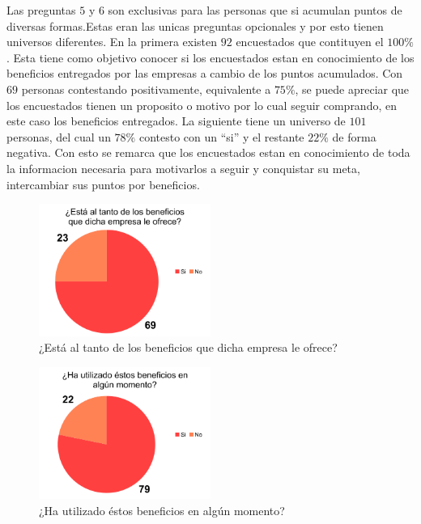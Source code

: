 Las preguntas $5$ y $6$ son exclusivas para las personas que si acumulan puntos de diversas formas.Estas
eran las unicas preguntas opcionales y por esto tienen universos diferentes.
En la primera existen $92$ encuestados que contituyen el $100\%$. Esta tiene como objetivo conocer
si los encuestados estan en conocimiento de los beneficios entregados por las empresas a cambio de
 los puntos acumulados. Con $69$ personas contestando positivamente, equivalente a $75\%$, se puede
apreciar que los encuestados tienen un proposito o motivo por lo cual seguir comprando, en este caso
los beneficios entregados.
La siguiente tiene un universo de $101$ personas, del cual un $78\%$ contesto con un ``si'' y el
restante $22\%$ de forma negativa. Con esto se remarca que los encuestados estan en conocimiento
de toda la informacion necesaria para motivarlos a seguir y conquistar su meta, intercambiar sus
puntos por beneficios.

\begin{figure}[!htb]
  \centering
  \includegraphics[width=0.5\textwidth]{images/chartPreg5.png}
  \caption[chart5]{¿Está al tanto de los beneficios que dicha empresa le ofrece?}
  \label{fig:chart2}
\end{figure}


\begin{figure}[!htb]
  \centering
  \includegraphics[width=0.5\textwidth]{images/chartPreg6.png}
  \caption[chart6]{¿Ha utilizado éstos beneficios en algún momento?}
  \label{fig:chart2}
\end{figure}

